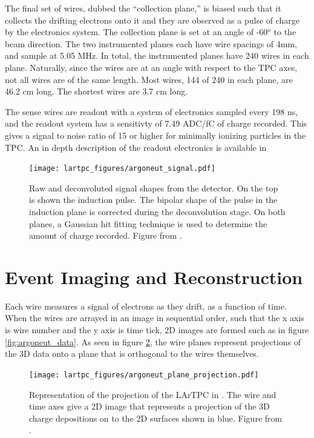 The final set of wires, dubbed the ``collection plane,'' is biased such that it collects the drifting electrons onto it and they are observed as a pulse of charge by the electronics system.  The collection plane is set at an angle of -60$^o$ to the beam direction.  The two instrumented planes each have wire spacings of 4mm, and sample at 5.05 MHz.  In total, the instrumented planes have 240 wires in each plane.  Naturally, since the wires are at an angle with respect to the TPC axes, not all wires are of the same length.  Most wires, 144 of 240 in each plane, are 46.2 cm long.  The shortest wires are 3.7 cm long.

The sense wires are readout with a system of electronics sampled every 198 ns, and the readout system has a sensitivty of 7.49 ADC/fC of charge recorded.  This gives a signal to noise ratio of 15 or higher for minimally ionizing particles in the TPC.  An in depth description of the \argoneut readout electronics is available in \cite{Anderson:2012vc}


\begin{figure}[h]
  \centering
  \texttt{[image: lartpc\_figures/argoneut\_signal.pdf]}
  \caption[Deconvolution of \argoneut Signals]{Raw and deconvoluted signal shapes from the \argoneut detector.  On the top is shown the induction pulse.  The bipolar shape of the pulse in the induction plane is corrected during the deconvolution stage.  On both planes, a Gaussian hit fitting technique is used to determine the amount of charge recorded. Figure from \cite{Anderson:2012vc}.}
  \label{fig:argoneut_signals}
\end{figure}

\section{\label{sec:lartpc_reconstruction} Event Imaging and Reconstruction}

Each wire measures a signal of electrons as they drift, as a function of time.  When the wires are arrayed in an image in sequential order, such that the x axis is wire number and the y axis is time tick, 2D images are formed such as in figure \ref{fig:argoneut_data}.  As seen in figure \ref{fig:argoneut_projection}, the wire planes represent projections of the 3D data onto a plane that is orthogonal to the wires themselves.


\begin{figure}[h]
  \centering
  \texttt{[image: lartpc\_figures/argoneut\_plane\_projection.pdf]}
  \caption[\argoneut 3D projection]{Representation of the projection of the LArTPC in \argoneut.  The wire and time axes give a 2D image that represents a projection of the 3D charge depositions on to the 2D surfaces shown in blue.  Figure from \cite{Anderson:2012vc}.}
  \label{fig:argoneut_projection}
\end{figure}

